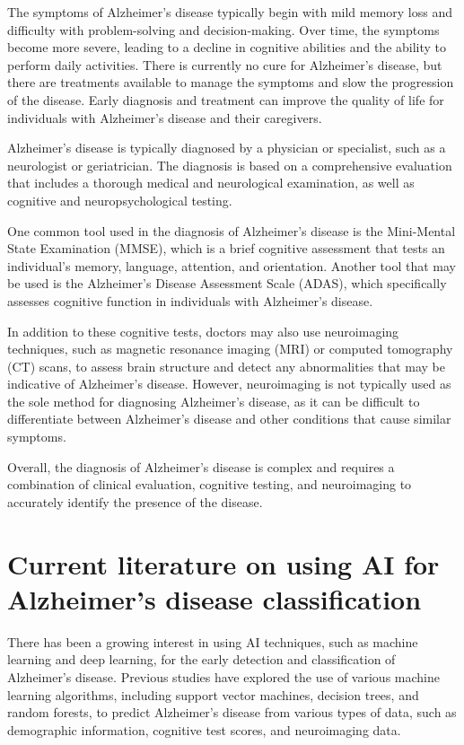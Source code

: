 \documentclass[10pt]{article}
\begin{document}
	The symptoms of Alzheimer's disease typically begin with mild memory loss and difficulty with problem-solving and decision-making. Over time, the symptoms become more severe, leading to a decline in cognitive abilities and the ability to perform daily activities. There is currently no cure for Alzheimer's disease, but there are treatments available to manage the symptoms and slow the progression of the disease. Early diagnosis and treatment can improve the quality of life for individuals with Alzheimer's disease and their caregivers.

	Alzheimer's disease is typically diagnosed by a physician or specialist, such as a neurologist or geriatrician. The diagnosis is based on a comprehensive evaluation that includes a thorough medical and neurological examination, as well as cognitive and neuropsychological testing.

	One common tool used in the diagnosis of Alzheimer's disease is the Mini-Mental State Examination (MMSE), which is a brief cognitive assessment that tests an individual's memory, language, attention, and orientation. Another tool that may be used is the Alzheimer's Disease Assessment Scale (ADAS), which specifically assesses cognitive function in individuals with Alzheimer's disease.

	In addition to these cognitive tests, doctors may also use neuroimaging techniques, such as magnetic resonance imaging (MRI) or computed tomography (CT) scans, to assess brain structure and detect any abnormalities that may be indicative of Alzheimer's disease. However, neuroimaging is not typically used as the sole method for diagnosing Alzheimer's disease, as it can be difficult to differentiate between Alzheimer's disease and other conditions that cause similar symptoms.

	Overall, the diagnosis of Alzheimer's disease is complex and requires a combination of clinical evaluation, cognitive testing, and neuroimaging to accurately identify the presence of the disease.

	\section{Current literature on using AI for Alzheimer's disease classification}

	There has been a growing interest in using AI techniques, such as machine learning and deep learning, for the early detection and classification of Alzheimer's disease. Previous studies have explored the use of various machine learning algorithms, including support vector machines, decision trees, and random forests, to predict Alzheimer's disease from various types of data, such as demographic information, cognitive test scores, and neuroimaging data.
\end{document}
